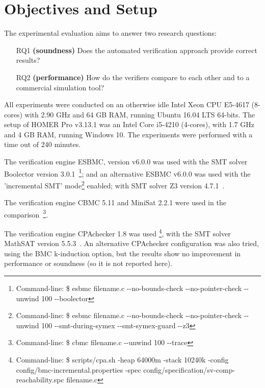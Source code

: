 \section{Objectives and Setup}
\label{sec:setup}

The experimental evaluation aims to answer two research questions:
%
\begin{enumerate}
\item[RQ1] \textbf{(soundness)} Does the automated verification approach provide correct results?
\item[RQ2] \textbf{(performance)} How do the verifiers compare to each other and to a commercial simulation tool?
\end{enumerate}

%
All experiments were conducted on an otherwise idle Intel Xeon CPU E5-4617 (8-cores) with 2.90 GHz and 64 GB RAM, running Ubuntu 16.04 LTS 64-bits. The setup of HOMER Pro v3.13.1 was an Intel Core i5-4210 (4-cores), with 1.7 GHz and 4 GB RAM, running Windows 10. The experiments were performed with a time out of 240 minutes.

The verification engine ESBMC, version v6.0.0 was used with the SMT solver Boolector version 3.0.1~\cite{Brummayer}\footnote{Command-line: \$ esbmc filename.c -\phantom{}-no-bounds-check -\phantom{}-no-pointer-check -\phantom{}-unwind 100 -\phantom{}-boolector}; and an alternative ESBMC v6.0.0 was used with the 'incremental SMT' mode\footnote{Command-line: \$ esbmc filename.c -\phantom{}-no-bounds-check -\phantom{}-no-pointer-check -\phantom{}-unwind 100 -\phantom{}-smt-during-symex -\phantom{}-smt-symex-guard -\phantom{}-z3} enabled; with SMT solver Z3 version 4.7.1~\cite{DeMoura}. %

The verification engine CBMC 5.11 and MiniSat 2.2.1 were used in the comparison~\cite{Kroening}\footnote{Command-line: \$ cbmc filename.c -\phantom{}-unwind 100 -\phantom{}-trace}.
 
The verification engine CPAchecker 1.8 was used \footnote{Command-line: \$ scripts/cpa.sh -heap 64000m -stack 10240k -config config/bmc-incremental.properties -spec config/specification/sv-comp-reachability.spc filename.c}, with the SMT solver MathSAT version 5.5.3~\cite{mathsat5}. An alternative CPAchecker configuration was also tried, using the BMC k-induction option, but the results show no improvement in performance or soundness (so it is not reported here).

